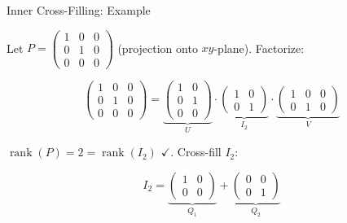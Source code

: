 \documentclass[10pt]{beamer}
\theoremstyle{definition}
\begin{document}
\begin{frame}{Inner Cross-Filling: Example}

Let $P = \begin{pmatrix} 1 & 0 & 0 \\ 0 & 1 & 0 \\ 0 & 0 & 0 \end{pmatrix}$ (projection onto $xy$-plane). Factorize:

$$\begin{pmatrix} 1 & 0 & 0 \\ 0 & 1 & 0 \\ 0 & 0 & 0 \end{pmatrix} = \underbrace{\begin{pmatrix} 1 & 0 \\ 0 & 1 \\ 0 & 0 \end{pmatrix}}_{U} \cdot \underbrace{\begin{pmatrix} 1 & 0 \\ 0 & 1 \end{pmatrix}}_{I_2} \cdot \underbrace{\begin{pmatrix} 1 & 0 & 0 \\ 0 & 1 & 0 \end{pmatrix}}_{V}$$

$\operatorname{rank}(P) = 2 = \operatorname{rank}(I_2)$ $\checkmark$. Cross-fill $I_2$:

$$I_2 = \underbrace{\begin{pmatrix} 1 & 0 \\ 0 & 0 \end{pmatrix}}_{Q_1} + \underbrace{\begin{pmatrix} 0 & 0 \\ 0 & 1 \end{pmatrix}}_{Q_2}$$

\end{frame}
\end{document}
